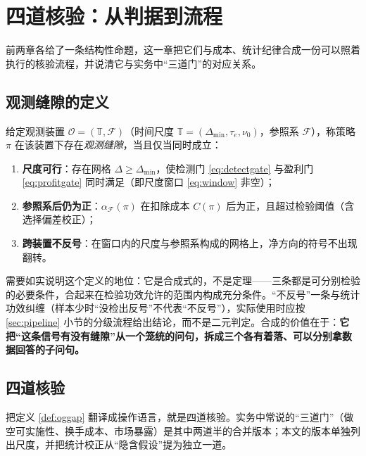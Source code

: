 \section{四道核验：从判据到流程}\label{sec:criteria}

前两章各给了一条结构性命题，这一章把它们与成本、统计纪律合成一份可以照着执行的核验流程，并说清它与实务中“三道门”的对应关系。

\subsection{观测缝隙的定义}

\begin{definition}[观测缝隙]\label{def:oggap}
给定观测装置 $\mathcal{O}=(\mathbb{T},\mathcal{F})$（时间尺度 $\mathbb{T}=(\Delta_{\min},\tau_e,\nu_0)$，参照系 $\mathcal{F}$），称策略 $\pi$ 在该装置下存在\emph{观测缝隙}，当且仅当同时成立：
\begin{enumerate}
  \item \textbf{尺度可行}：存在网格 $\Delta\ge\Delta_{\min}$，使检测门 \eqref{eq:detectgate} 与盈利门 \eqref{eq:profitgate} 同时满足（即尺度窗口 \eqref{eq:window} 非空）；
  \item \textbf{参照系后仍为正}：$\alpha_{\mathcal{F}}(\pi)$ 在扣除成本 $C(\pi)$ 后为正，且超过检验阈值（含选择偏差校正）；
  \item \textbf{跨装置不反号}：在窗口内的尺度与参照系构成的网格上，净方向的符号不出现翻转。
\end{enumerate}
\end{definition}

需要如实说明这个定义的地位：它是合成式的，不是定理——三条都是可分别检验的必要条件，合起来在检验功效允许的范围内构成充分条件。“不反号”一条与统计功效纠缠（样本少时“没检出反号”不代表“不反号”），实际使用时应按 \ref{sec:pipeline} 小节的分级流程给出结论，而不是二元判定。合成的价值在于：\textbf{它把“这条信号有没有缝隙”从一个笼统的问句，拆成三个各有着落、可以分别拿数据回答的子问句。}

\subsection{四道核验}

把定义 \ref{def:oggap} 翻译成操作语言，就是四道核验。实务中常说的“三道门”（做空可实施性、换手成本、市场暴露）是其中两道半的合并版本；本文的版本单独列出尺度，并把统计校正从“隐含假设”提为独立一道。

